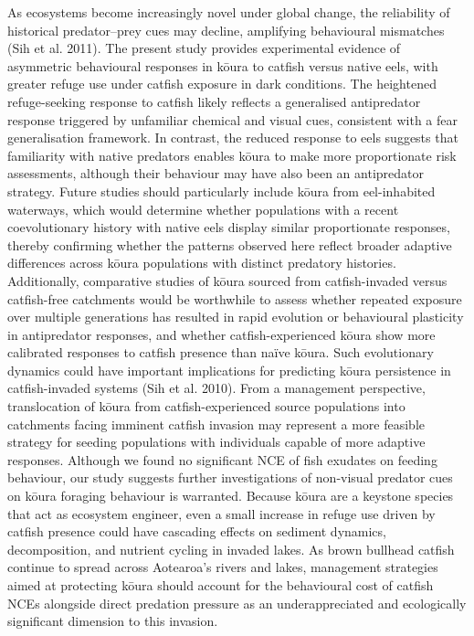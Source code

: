 \documentclass[
  12pt,
  a4paper,
  oneside]{scrbook}
\begin{document}
As ecosystems become increasingly novel under global change, the
reliability of historical predator--prey cues may decline, amplifying
behavioural mismatches (Sih et al. 2011). The present study provides
experimental evidence of asymmetric behavioural responses in kōura to
catfish versus native eels, with greater refuge use under catfish
exposure in dark conditions. The heightened refuge-seeking response to
catfish likely reflects a generalised antipredator response triggered by
unfamiliar chemical and visual cues, consistent with a fear
generalisation framework. In contrast, the reduced response to eels
suggests that familiarity with native predators enables kōura to make
more proportionate risk assessments, although their behaviour may have
also been an antipredator strategy. Future studies should particularly
include kōura from eel-inhabited waterways, which would determine
whether populations with a recent coevolutionary history with native
eels display similar proportionate responses, thereby confirming whether
the patterns observed here reflect broader adaptive differences across
kōura populations with distinct predatory histories. Additionally,
comparative studies of kōura sourced from catfish-invaded versus
catfish-free catchments would be worthwhile to assess whether repeated
exposure over multiple generations has resulted in rapid evolution or
behavioural plasticity in antipredator responses, and whether
catfish-experienced kōura show more calibrated responses to catfish
presence than naïve kōura. Such evolutionary dynamics could have
important implications for predicting kōura persistence in
catfish-invaded systems (Sih et al. 2010). From a management
perspective, translocation of kōura from catfish-experienced source
populations into catchments facing imminent catfish invasion may
represent a more feasible strategy for seeding populations with
individuals capable of more adaptive responses. Although we found no
significant NCE of fish exudates on feeding behaviour, our study
suggests further investigations of non-visual predator cues on kōura
foraging behaviour is warranted. Because kōura are a keystone species
that act as ecosystem engineer, even a small increase in refuge use
driven by catfish presence could have cascading effects on sediment
dynamics, decomposition, and nutrient cycling in invaded lakes. As brown
bullhead catfish continue to spread across Aotearoa's rivers and lakes,
management strategies aimed at protecting kōura should account for the
behavioural cost of catfish NCEs alongside direct predation pressure as
an underappreciated and ecologically significant dimension to this
invasion.
\end{document}
